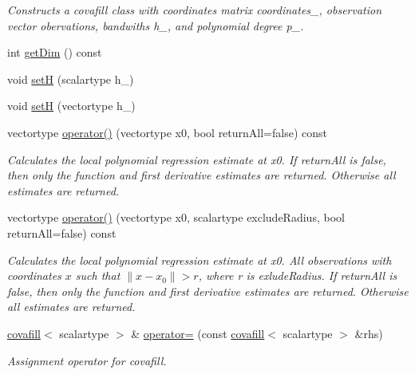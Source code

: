 \begin{DoxyCompactItemize}
\begin{DoxyCompactList}\small\item\em Constructs a covafill class with coordinates matrix {\itshape coordinates\+\_\+}, observation vector {\itshape obervations}, bandwiths {\itshape h\+\_\+}, and polynomial degree {\itshape p\+\_\+}. \end{DoxyCompactList}\item 
int \hyperlink{classcovafill_a9fdfc9fb312a1848d2b1258b3a3d56a1}{get\+Dim} () const 
\item 
void \hyperlink{classcovafill_a7be100b5c111aa446578116c119e564b}{set\+H} (scalartype h\+\_\+)
\item 
void \hyperlink{classcovafill_aec6cd784c27dc9692ef25dc5b20fe97b}{set\+H} (vectortype h\+\_\+)
\item 
\hypertarget{classcovafill_abf579279adbd0ff452e00cd91f4ada93}{}vectortype \hyperlink{classcovafill_abf579279adbd0ff452e00cd91f4ada93}{operator()} (vectortype x0, bool return\+All=false) const \label{classcovafill_abf579279adbd0ff452e00cd91f4ada93}

\begin{DoxyCompactList}\small\item\em Calculates the local polynomial regression estimate at {\itshape x0}. If {\itshape return\+All} is false, then only the function and first derivative estimates are returned. Otherwise all estimates are returned. \end{DoxyCompactList}\item 
\hypertarget{classcovafill_a6e76b761e31f54838ef6590e36746d3b}{}vectortype \hyperlink{classcovafill_a6e76b761e31f54838ef6590e36746d3b}{operator()} (vectortype x0, scalartype exclude\+Radius, bool return\+All=false) const \label{classcovafill_a6e76b761e31f54838ef6590e36746d3b}

\begin{DoxyCompactList}\small\item\em Calculates the local polynomial regression estimate at {\itshape x0}. All observations with coordinates $ x $ such that $ \|x-x_0\| > r $, where {\itshape r} is {\itshape exlude\+Radius}. If {\itshape return\+All} is false, then only the function and first derivative estimates are returned. Otherwise all estimates are returned. \end{DoxyCompactList}\item 
\hypertarget{classcovafill_ad7a89edf7a67e8e8994d9a782b476d27}{}\hyperlink{classcovafill}{covafill}$<$ scalartype $>$ \& \hyperlink{classcovafill_ad7a89edf7a67e8e8994d9a782b476d27}{operator=} (const \hyperlink{classcovafill}{covafill}$<$ scalartype $>$ \&rhs)\label{classcovafill_ad7a89edf7a67e8e8994d9a782b476d27}

\begin{DoxyCompactList}\small\item\em Assignment operator for covafill. \end{DoxyCompactList}\end{DoxyCompactItemize}

